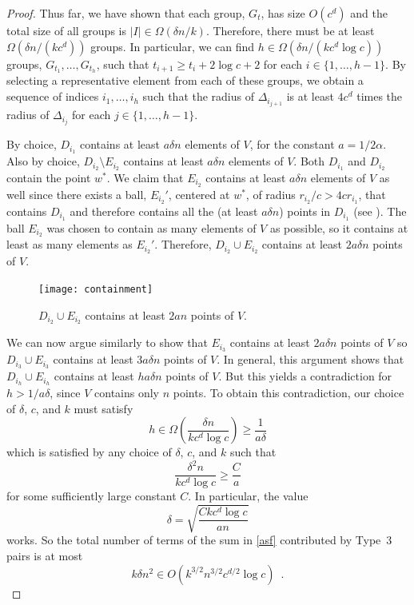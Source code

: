 \documentclass{patmorin}
\begin{document}
\begin{proof}
  Thus far, we have shown that each group, $G_t$, has size $O(c^d)$
  and the total size of all groups is $|I|\in\Omega(\delta n/k)$.
  Therefore, there must be at least $\Omega(\delta n/(kc^d))$ groups.
  In particular, we can find $h\in\Omega(\delta n/(kc^d\log c))$ groups,
  $G_{t_1},\ldots,G_{t_h}$, such that $t_{i+1} \ge t_{i}+2\log c+2$ for
  each $i\in\{1,\ldots,h-1\}$.  By selecting a representative element from
  each of these groups, we obtain a sequence of indices $i_1,\ldots,i_h$
  such that the radius of $\Delta_{i_{j+1}}$ is at least $4c^d$ times
  the radius of $\Delta_{i_j}$ for each $j\in\{1,\ldots,h-1\}$.

  By choice, $D_{i_1}$ contains at least $ a \delta n$ elements of
  $V$, for the constant $a=1/2\alpha$.  Also by choice, $D_{i_2}\setminus
  E_{i_2}$ contains at least $ a \delta n$ elements of $V$.
  Both $D_{i_1}$ and $D_{i_2}$ contain the point $w^*$.  We claim
  that $E_{i_2}$ contains at least $ a \delta n$ elements of $V$
  as well since there exists a ball, $E_{i_2}'$, centered at $w^*$,
  of radius $r_{i_2}/c > 4cr_{i_1}$, that contains $D_{i_1}$ and
  therefore contains all the (at least $ a\delta n$) points in $D_{i_1}$
  (see ).  The ball $E_{i_2}$ was chosen to contain
  as many elements of $V$ as possible, so it contains at least as many
  elements as $E_{i_2}'$.  Therefore, $D_{i_2}\cup E_{i_2}$ contains at
  least $2 a  \delta n$ points of $V$.

  \begin{figure}
     \begin{center}
       \texttt{[image: containment]}
     \end{center}
     \caption{$D_{i_2}\cup E_{i_2}$ contains at least $2 a  n$ 
              points of $V$.}
   \end{figure}

  We can now argue similarly to show that $E_{i_3}$ contains at
  least $2 a \delta n$ points of $V$ so $D_{i_3}\cup E_{i_3}$
  contains at least $3 a \delta n$ points of $V$.  In general,
  this argument shows that $D_{i_h}\cup E_{i_h}$ contains at least
  $h a \delta n$ points of $V$.  But this yields a contradiction for
  $h> 1/ a \delta$, since $V$ contains only $n$ points.  To obtain
  this contradiction, our choice of $\delta$, $c$, and $k$ must satisfy
  \[
       h\in\Omega\left(\frac{\delta n}{kc^d\log c}\right) \ge
          \frac{1}{ a  \delta}
  \]
  which is satisfied by any choice of $\delta$, $c$, and $k$ such that
  \[
       \frac{\delta^2 n}{kc^d\log c} \ge \frac{C}{a}
  \]
  for some sufficiently large constant $C$.  In particular, the value
  \[
       \delta = \sqrt{\frac{Ckc^d\log c}{an}}
  \]
  works.  So the total number of terms of the sum in \eqref{asf}
  contributed by Type~3 pairs is at most
  \[
    k\delta n^2 \in O(k^{3/2}n^{3/2}c^{d/2}\log c) \enspace .
  \]


\end{proof}
\end{document}
